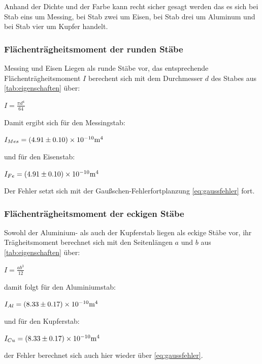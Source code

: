 Anhand der Dichte und der Farbe kann recht sicher gesagt werden das es sich bei Stab eins um Messing,
bei Stab zwei um Eisen, bei Stab drei um Aluminum und bei Stab vier um Kupfer handelt.


\subsubsection{Flächenträgheitsmoment der runden Stäbe}
Messing und Eisen Liegen als runde Stäbe vor, das entsprechende Flächenträgheitsmoment $I$ berechent sich 
mit dem Durchmesser $d$ des Stabes aus \autoref{tab:eigenschaften} über:
\begin{center}
    $I=\frac{\pi d^4}{64}$
\end{center} 
Damit ergibt sich für den Messingstab:
\begin{center}
    $I_{Mes}=(4.91\pm 0.10)\times 10^{-10}\si[]{m^4}$
\end{center}
und für den Eisenstab:
\begin{center}
    $I_{Fe}=(4.91\pm 0.10)\times 10^{-10}\si[]{m^4}$
\end{center}
Der Fehler setzt sich mit der Gaußschen-Fehlerfortplanzung \autoref{eq:gaussfehler} fort.
\subsubsection{Flächenträgheitsmoment der eckigen Stäbe}
Sowohl der Aluminium- als auch der Kupferstab liegen als eckige Stäbe vor,
ihr Trägheitsmoment berechnet sich mit den Seitenlängen $a$ und $b$ aus \autoref{tab:eigenschaften}
über:
\begin{center}
    $I=\frac{ab^3}{12}$
\end{center}
damit folgt für den Aluminiumstab:
\begin{center}
    $I_{Al}=(8.33\pm 0.17)\times 10^{-10}\si[]{m^4}$   
\end{center}
und für den Kupferstab:
\begin{center}
    $I_{Cu}=(8.33\pm 0.17)\times 10^{-10}\si[]{m^4}$
\end{center}
der Fehler berechnet sich auch hier wieder über \autoref{eq:gaussfehler}.
